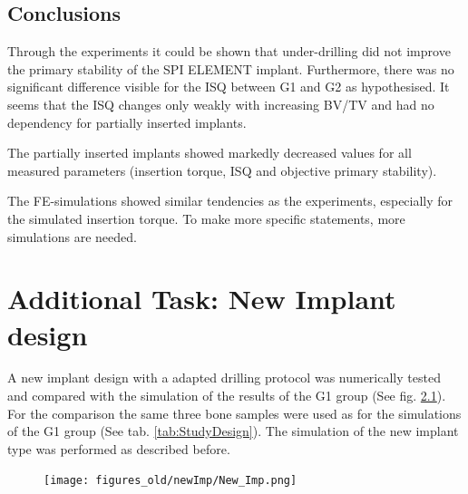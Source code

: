 \documentclass[12pt, a4paper, twoside]{report}
\begin{document}
%
\begin{figure}[H]
\centering 
{}
\label{fig:UF_simvsexp}
\end{figure}
%
%
%
\newpage
%
\section{Conclusions}
%
Through the experiments it could be shown that under-drilling did not improve the primary stability of the SPI ELEMENT implant. Furthermore, there was no significant difference visible for the ISQ between G1 and G2 as hypothesised. It seems that the ISQ changes only weakly with increasing BV/TV and had no dependency for partially inserted implants.

The partially inserted implants showed markedly decreased values for all measured parameters (insertion torque, ISQ and objective primary stability).

The FE-simulations showed similar tendencies as the experiments, especially for the simulated insertion torque. To make more specific statements, more simulations are needed.



\newpage
%
\chapter{Additional Task: New Implant design}
%
A new implant design with a adapted drilling protocol was numerically tested and compared with the simulation of the results of the G1 group (See fig. \ref{fig:New_Imp}). For the comparison the same three bone samples were used as for the simulations of the G1 group (See tab. \ref{tab:StudyDesign}). The simulation of the new implant type was performed as described before.
%
\begin{figure}[H]
\centering 
\label{sublable2}\texttt{[image: figures\_old/newImp/New\_Imp.png]}
\label{fig:New_Imp}
\end{figure}
%
\end{document}
